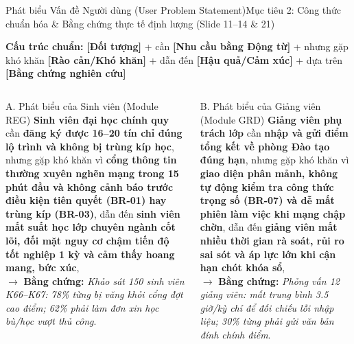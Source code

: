 \documentclass[aspectratio=169, 10pt]{beamer}
\begin{document}
\begin{frame}[t]{Phát biểu Vấn đề Người dùng (User Problem Statement)}{Mục tiêu 2: Công thức chuẩn hóa \& Bằng chứng thực tế định lượng (Slide 11--14 \& 21)}
  \vspace{-0.15cm}
  \begin{tcolorbox}[colback=NavyDark!5!white, colframe=NavyDark, arc=1mm, boxrule=0.5pt, left=2.5mm, right=2.5mm, top=1.2mm, bottom=1.2mm]
    \centering\scriptsize
    \textbf{Cấu trúc chuẩn:} {\color{NavyDark}\textbf{[Đối tượng]}} + cần {\color{PrimaryBlue}\textbf{[Nhu cầu bằng Động từ]}} + nhưng gặp khó khăn {\color{HustRed}\textbf{[Rào cản/Khó khăn]}} + dẫn đến {\color{WarningAmber}\textbf{[Hậu quả/Cảm xúc]}} + dựa trên {\color{SecondaryTeal}\textbf{[Bằng chứng nghiên cứu]}}
  \end{tcolorbox}
  \vspace{-0.1cm}

  \begin{columns}[T]
      \begin{alertCard}{A. Phát biểu của Sinh viên (Module REG)}
        \scriptsize
        \textbf{Sinh viên đại học chính quy} cần \textbf{đăng ký được 16--20 tín chỉ đúng lộ trình và không bị trùng kíp học}, nhưng gặp khó khăn vì \textbf{cổng thông tin thường xuyên nghẽn mạng trong 15 phút đầu và không cảnh báo trước điều kiện tiên quyết (BR-01) hay trùng kíp (BR-03)}, dẫn đến \textbf{sinh viên mất suất học lớp chuyên ngành cốt lõi, đối mặt nguy cơ chậm tiến độ tốt nghiệp 1 kỳ và cảm thấy hoang mang, bức xúc},\\
        $\to$ \textbf{Bằng chứng:} \textit{Khảo sát 150 sinh viên K66--K67: 78\% từng bị văng khỏi cổng đợt cao điểm; 62\% phải làm đơn xin học bù/học vượt thủ công}.
      \end{alertCard}

      \begin{alertCard}{B. Phát biểu của Giảng viên (Module GRD)}
        \scriptsize
        \textbf{Giảng viên phụ trách lớp} cần \textbf{nhập và gửi điểm tổng kết về phòng Đào tạo đúng hạn}, nhưng gặp khó khăn vì \textbf{giao diện phân mảnh, không tự động kiểm tra công thức trọng số (BR-07) và dễ mất phiên làm việc khi mạng chập chờn}, dẫn đến \textbf{giảng viên mất nhiều thời gian rà soát, rủi ro sai sót và áp lực lớn khi cận hạn chót khóa sổ},\\
        $\to$ \textbf{Bằng chứng:} \textit{Phỏng vấn 12 giảng viên: mất trung bình 3.5 giờ/kỳ chỉ để đối chiếu lỗi nhập liệu; 30\% từng phải gửi văn bản đính chính điểm}.
      \end{alertCard}
  \end{columns}
\end{frame}
\end{document}
